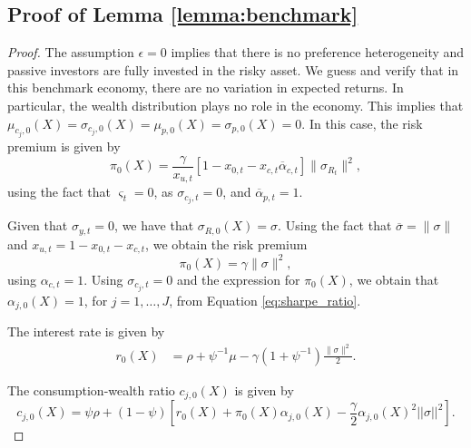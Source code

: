 \subsection{Proof of Lemma \ref{lemma:benchmark}}\label{app:lemma1}

\begin{proof} The assumption $\epsilon = 0$ implies that there is no preference heterogeneity and passive investors are fully invested in the risky asset. We guess and verify that in this benchmark economy, there are no variation in expected returns. In particular, the wealth distribution plays no role in the economy. This implies that $\mu_{c_j,0}(X) = \sigma_{c_j,0}(X) = \mu_{p,0}(X) = \sigma_{p,0}(X) = 0$. In this case, the risk premium is given by
\begin{equation}
    \pi_{0}(X) =  \frac{\gamma}{x_{u,t}} \left[ 1-x_{0,t}-x_{c,t} \overline{\alpha}_{c,t}\right] \|\sigma_{R_t}\|^ 2 ,
\end{equation}
using the fact that $\varsigma_t = 0$, as $\sigma_{c_j,t} = 0$, and $\overline{\alpha}_{p,t} =1$. 

Given that $\sigma_{y,t} = 0$, we have that $\sigma_{R,0}(X) = \sigma$. 
Using the fact that $\overline{\sigma}=\|\sigma\|$ and $x_{u,t}=1-x_{0,t}-x_{c,t}$, we obtain the risk premium $$\pi_{0}(X) = \gamma \|\sigma\|^2,$$  using $\alpha_{c,t} = 1$.
Using $\sigma_{c_j,t} = 0$ and the expression for $\pi_0(X)$, we obtain that $\alpha_{j,0}(X) = 1$, for $j=1,\ldots, J$, from Equation \eqref{eq:sharpe_ratio}. 

The interest rate is given by
\begin{align}
     r_0(X)   &  =  \rho +\psi^{-1} \mu-  \gamma(1+\psi^{-1})\frac{\|\sigma\|^2}{2} .
\end{align}

The consumption-wealth ratio $c_{j,0}(X)$ is given by
\begin{equation}
    c_{j,0}(X) = \psi \rho + (1-\psi) \left[ r_0(X) + \pi_0(X) \alpha_{j,0}(X) - \frac{\gamma}{2} \alpha_{j,0}(X)^2||\sigma||^2 \right].
\end{equation}


\end{proof}
